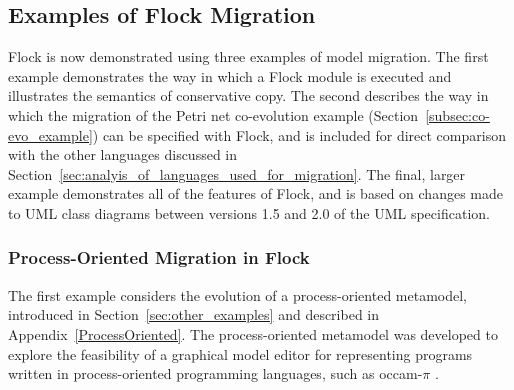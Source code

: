 \subsection{Examples of Flock Migration}
\label{subsec:flock_examples}
Flock is now demonstrated using three examples of model migration. The first example demonstrates the way in which a Flock module is executed and illustrates the semantics of conservative copy. The second describes the way in which the migration of the Petri net co-evolution example (Section~\ref{subsec:co-evo_example}) can be specified with Flock, and is included for direct comparison with the other languages discussed in Section~\ref{sec:analyis_of_languages_used_for_migration}. The final, larger example demonstrates all of the features of Flock, and is based on changes made to UML class diagrams between versions 1.5 and 2.0 of the UML specification.

\subsubsection{Process-Oriented Migration in Flock}
The first example considers the evolution of a process-oriented metamodel, introduced in Section~\ref{sec:other_examples} and described in Appendix~\ref{ProcessOriented}. The process-oriented metamodel was developed to explore the feasibility of a graphical model editor for representing programs written in process-oriented programming languages, such as occam-$\pi$ \cite{occam_pi}.

